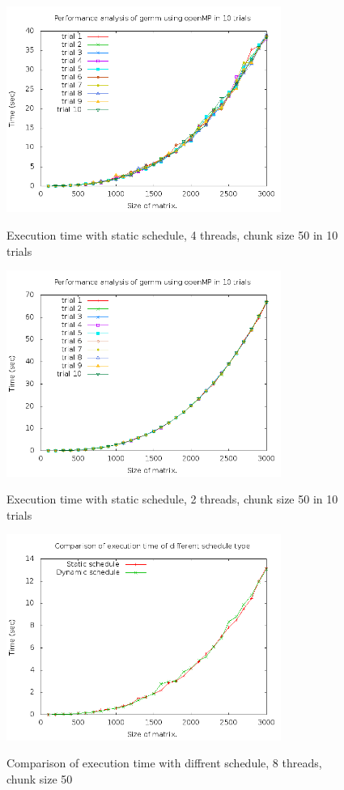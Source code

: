\documentclass{article}
\begin{document}
    \begin{figure}[th!]
        \centering
        \includegraphics[width=0.8\textwidth]{static_ck50_4.png}
        \label{fig:5}
        \caption{Execution time with static schedule, 4 threads, chunk size 50 in 10 trials}
    \end{figure}

    \begin{figure}[th!]
        \centering
        \includegraphics[width=0.8\textwidth]{static_ck50_2.png}
        \label{fig:6}
        \caption{Execution time with static schedule, 2 threads, chunk size 50 in 10 trials}
    \end{figure}

    \begin{figure}[th!]
        \centering
        \includegraphics[width=0.8\textwidth]{ck50_8.png}
        \label{fig:7}
        \caption{Comparison of execution time with diffrent schedule, 8 threads, chunk size 50}
    \end{figure}
    
\end{document}
